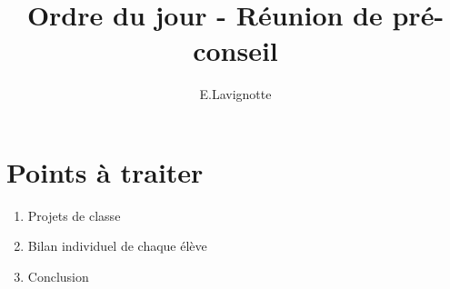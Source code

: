 \documentclass[11pt]{article}
\begin{document}
\title{\vspace{-1.5cm}Ordre du jour - R\'{e}union de pr\'{e}-conseil}
\author{E.Lavignotte}
\date{}
\maketitle

\section{Points \`{a} traiter}

\begin{enumerate}
\item Projets de classe
\item Bilan individuel de chaque \'{e}l\`{e}ve
\item Conclusion
\end{enumerate}
\end{document}
